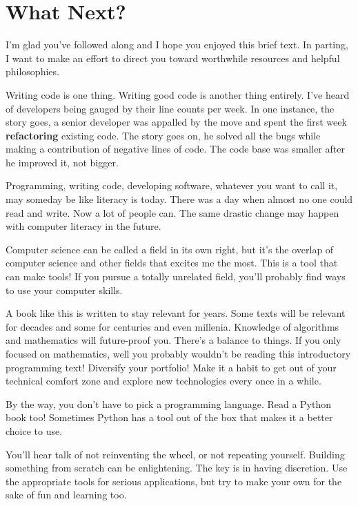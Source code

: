 \documentclass[
]{book}
\begin{document}
\hypertarget{Next}{%
\chapter{What Next?}\label{Next}}

I'm glad you've followed along and I hope you enjoyed this brief text. In parting, I want to make an effort to direct you toward worthwhile resources and helpful philosophies.

Writing code is one thing. Writing good code is another thing entirely. I've heard of developers being gauged by their line counts per week. In one instance, the story goes, a senior developer was appalled by the move and spent the first week \textbf{refactoring} existing code. The story goes on, he solved all the bugs while making a contribution of negative lines of code. The code base was smaller after he improved it, not bigger.

Programming, writing code, developing software, whatever you want to call it, may someday be like literacy is today. There was a day when almost no one could read and write. Now a lot of people can. The same drastic change may happen with computer literacy in the future.

Computer science can be called a field in its own right, but it's the overlap of computer science and other fields that excites me the most. This is a tool that can make tools! If you pursue a totally unrelated field, you'll probably find ways to use your computer skills.

A book like this is written to stay relevant for years. Some texts will be relevant for decades and some for centuries and even millenia. Knowledge of algorithms and mathematics will future-proof you. There's a balance to things. If you only focused on mathematics, well you probably wouldn't be reading this introductory programming text! Diversify your portfolio! Make it a habit to get out of your technical comfort zone and explore new technologies every once in a while.

By the way, you don't have to pick a programming language. Read a Python book too! Sometimes Python has a tool out of the box that makes it a better choice to use.

You'll hear talk of not reinventing the wheel, or not repeating yourself. Building something from scratch can be enlightening. The key is in having discretion. Use the appropriate tools for serious applications, but try to make your own for the sake of fun and learning too.
\end{document}

